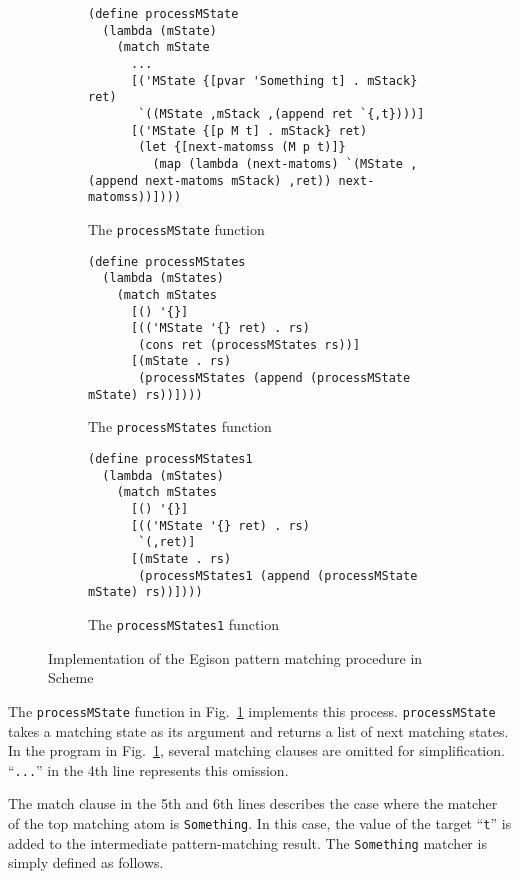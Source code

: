 \documentclass[acmlarge]{acmart}
\begin{document}
\begin{figure}[t]
 \begin{subfigure}[b]{1.0\linewidth}
\begin{lstlisting}[language=egison]
(define processMState
  (lambda (mState)
    (match mState
      ...
      [('MState {[pvar 'Something t] . mStack} ret)
       `((MState ,mStack ,(append ret `{,t})))]
      [('MState {[p M t] . mStack} ret)
       (let {[next-matomss (M p t)]}
         (map (lambda (next-matoms) `(MState ,(append next-matoms mStack) ,ret)) next-matomss))])))
\end{lstlisting}
  \caption{The \texttt{processMState} function}
  \label{fig:processMState}
 \end{subfigure}
  \medskip
 \begin{subfigure}[b]{1.0\linewidth}
\begin{lstlisting}[language=egison]
(define processMStates
  (lambda (mStates)
    (match mStates
      [() '{}]
      [(('MState '{} ret) . rs)
       (cons ret (processMStates rs))]
      [(mState . rs)
       (processMStates (append (processMState mState) rs))])))
\end{lstlisting}
  \caption{The \texttt{processMStates} function}
  \label{fig:processMStates}
 \end{subfigure}
  \medskip
 \begin{subfigure}[b]{1.0\linewidth}
\begin{lstlisting}[language=egison]
(define processMStates1
  (lambda (mStates)
    (match mStates
      [() '{}]
      [(('MState '{} ret) . rs)
       `(,ret)]
      [(mState . rs)
       (processMStates1 (append (processMState mState) rs))])))
\end{lstlisting}
  \caption{The \texttt{processMStates1} function}
  \label{fig:processMStates1}
 \end{subfigure}
 \caption{Implementation of the Egison pattern matching procedure in Scheme}
\end{figure}

The \lstinline{processMState} function in Fig.~\ref{fig:processMState} implements this process.
\lstinline{processMState} takes a matching state as its argument and returns a list of next matching states.
In the program in Fig.~\ref{fig:processMState}, several matching clauses are omitted for simplification.
``\lstinline{...}'' in the 4th line represents this omission.

The match clause in the 5th and 6th lines describes the case where the matcher of the top matching atom is \lstinline{Something}.
In this case, the value of the target ``\lstinline{t}'' is added to the intermediate pattern-matching result.
The \lstinline{Something} matcher is simply defined as follows.
\end{document}
